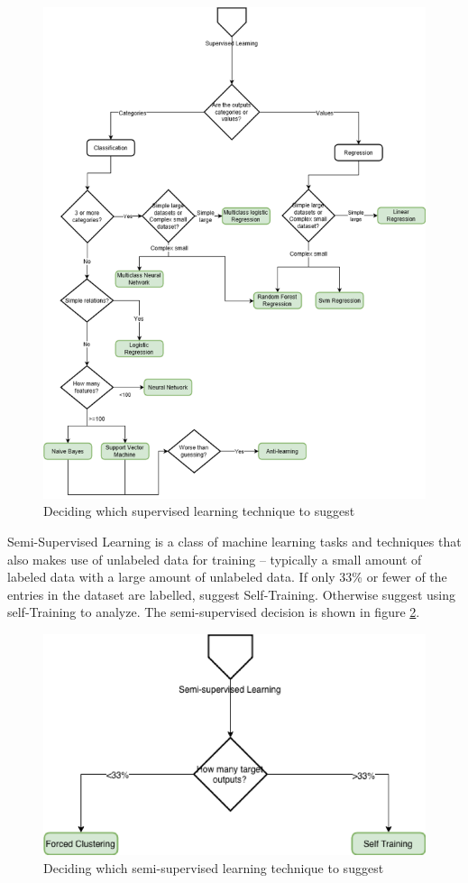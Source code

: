 \documentclass[a4paper,titlepage]{article}
\begin{document}
\begin{figure}[H]
  \centering
  \includegraphics[width=\textwidth]{supervised-decision}
  \caption{Deciding which supervised learning technique to suggest}
  \label{supervised-decision}
\end{figure}


Semi-Supervised Learning is a class of machine learning tasks and techniques that also makes use of unlabeled data for training – typically a small amount of labeled data with a large amount of unlabeled data.
If only 33\% or fewer of the entries in the dataset are labelled, suggest Self-Training.
Otherwise suggest using self-Training to analyze.
The semi-supervised decision is shown in figure \ref{semisupervised-decision}.

\begin{figure}[H]
  \centering
  \includegraphics[width=\textwidth]{semi-supervised}
  \caption{Deciding which semi-supervised learning technique to suggest}
  \label{semisupervised-decision}
\end{figure}
\end{document}
